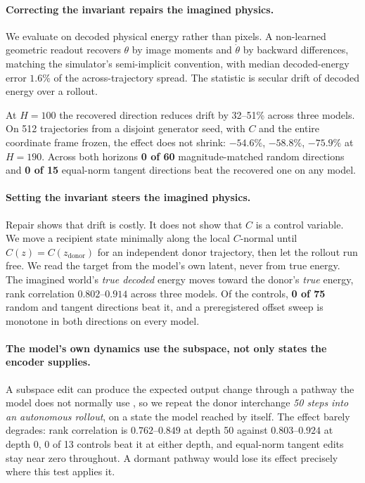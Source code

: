 \paragraph{Correcting the invariant repairs the imagined physics.}
We evaluate on decoded physical energy rather than pixels. A non-learned geometric readout recovers
$\theta$ by image moments and $\dot\theta$ by backward differences, matching the simulator's
semi-implicit convention, with median decoded-energy error $1.6\%$ of the across-trajectory spread.
The statistic is secular drift of decoded energy over a rollout.

At $H = 100$ the recovered direction reduces drift by 32--51\% across three models. On 512
trajectories from a disjoint generator seed, with $C$ and the entire coordinate frame frozen, the
effect does not shrink: $-54.6\%$, $-58.8\%$, $-75.9\%$ at $H = 190$. Across both horizons
\textbf{0 of 60} magnitude-matched random directions and \textbf{0 of 15} equal-norm tangent
directions beat the recovered one on any model.

\paragraph{Setting the invariant steers the imagined physics.}
Repair shows that drift is costly. It does not show that $C$ is a control variable. We move a
recipient state minimally along the local $C$-normal until $C(z) = C(z_{\mathrm{donor}})$ for an
independent donor trajectory, then let the rollout run free. We read the target from the model's own
latent, never from true energy. The imagined world's \emph{true decoded} energy moves toward the
donor's \emph{true} energy, rank correlation $0.802$--$0.914$ across three models. Of the controls,
\textbf{0 of 75} random and tangent directions beat it, and a preregistered offset sweep is monotone
in both directions on every model.

\paragraph{The model's own dynamics use the subspace, not only states the encoder supplies.}
A subspace edit can produce the expected output change through a pathway the model does not normally
use \citep{makelov2024illusion}, so we repeat the donor interchange \emph{50 steps into an autonomous
rollout}, on a state the model reached by itself. The effect barely degrades: rank correlation is
$0.762$--$0.849$ at depth 50 against $0.803$--$0.924$ at depth 0, 0 of 13 controls beat it at either
depth, and equal-norm tangent edits stay near zero throughout. A dormant pathway would lose its
effect precisely where this test applies it.

